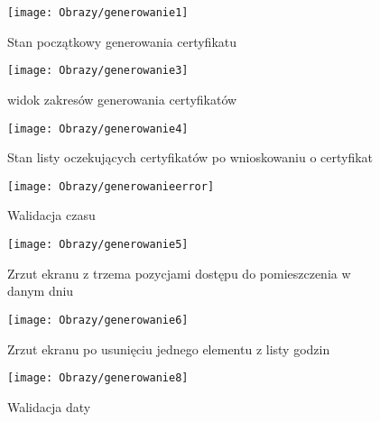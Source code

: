 \begin{enumerate*}
	\begin{figure}[ht!]	
		\centering
		\begin{minipage}{0.2\textwidth}
			\texttt{[image: Obrazy/generowanie1]}
			\caption{Stan początkowy generowania certyfikatu }
			\label{rys:generowanie1}
		\end{minipage}
	\hspace{0.02\textwidth}
		\begin{minipage}{0.2\textwidth}
			\texttt{[image: Obrazy/generowanie3]}
			\caption{widok zakresów generowania certyfikatów}
			\label{rys:generowanie2}
		\end{minipage}
	\hspace{0.02\textwidth}
		\begin{minipage}{0.2\textwidth}
			\vspace{0.35cm}
			\texttt{[image: Obrazy/generowanie4]}
			\caption{Stan listy oczekujących certyfikatów po wnioskowaniu o certyfikat}
			\label{rys:generowanie3}
		\end{minipage}	
	\hspace{0.02\textwidth}
		\begin{minipage}{0.2\textwidth}
			\vspace{-0.4cm}
			\texttt{[image: Obrazy/generowanieerror]}
			\caption{Walidacja czasu }
			\label{rys:generowanie4}
		\end{minipage}
	\end{figure}

	\begin{figure}
		\centering
		\begin{minipage}{0.2\textwidth}
			\vspace{0.4cm}
			\texttt{[image: Obrazy/generowanie5]}
			\caption{Zrzut ekranu z trzema pozycjami dostępu do pomieszczenia w danym dniu }
			\label{rys:generowanie5}
		\end{minipage}
	\hspace{0.05\textwidth}
		\begin{minipage}{0.2\textwidth}
			\texttt{[image: Obrazy/generowanie6]}
			\caption{Zrzut ekranu po usunięciu jednego elementu z listy godzin}
			\label{rys:generowanie6}
		\end{minipage}
	\hspace{0.05\textwidth}
		\begin{minipage}{0.2\textwidth}
			\vspace{-0.5cm}
			\texttt{[image: Obrazy/generowanie8]}
			\caption{Walidacja daty}
			\label{rys:generowanie7}
		\end{minipage}
	\end{figure}
	

\end{enumerate*}
